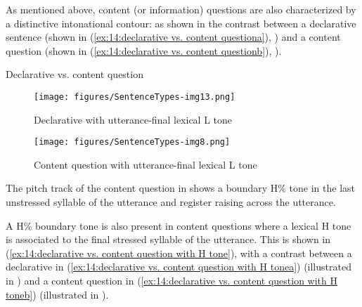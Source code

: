 As mentioned above, content (or information) questions are also characterized by a distinctive intonational contour: as shown in the contrast between a declarative sentence (shown in (\ref{ex:14:declarative vs. content questiona}), ) and a content question (shown in (\ref{ex:14:declarative vs. content questionb}), ).

\ea\label{ex:14:declarative vs. content question}
{Declarative vs. content question}

 \label{ex:14:declarative vs. content questiona}
        \label{ex:14:declarative vs. content questionb}
    \z
\z


\begin{figure}
\texttt{[image: figures/SentenceTypes-img13.png]}
\caption{
\label{fig: declarative with L tone-2}
Declarative with utterance-final lexical L tone}
\end{figure}

\begin{figure}
\texttt{[image: figures/SentenceTypes-img8.png]}
\caption{
\label{fig: content question lexical L  tone}
Content question with utterance-final lexical L tone}
\end{figure}

The pitch track of the content question in  shows a boundary H\% tone in the last unstressed syllable of the utterance and register raising across the utterance.

\largerpage
A H\% boundary tone is also present in content questions where a lexical H tone is associated to the final stressed syllable of the utterance. This is shown in (\ref{ex:14:declarative vs. content question with H tone}), with a contrast between a declarative in (\ref{ex:14:declarative vs. content question with H tonea}) (illustrated in ) and a content question in (\ref{ex:14:declarative vs. content question with H toneb}) (illustrated in ).

